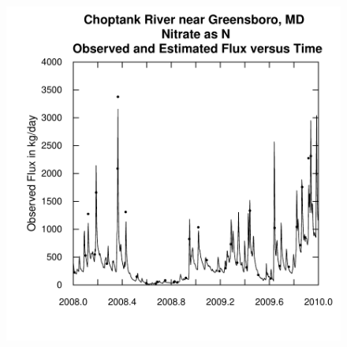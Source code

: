 \documentclass[a4paper,11pt]{article}
\begin{document}
\begin{figure}[htbp]
  \begin{minipage}[h]{0.5\linewidth}
    \begin{center}

\includegraphics{EGRET-figplotFluxTimeDaily}
    \label{fig:plotFluxTimeDaily}
    \end{center}
  \end{minipage}
  \begin{minipage}[h]{0.5\linewidth}
    \begin{center}



\end{center}
\end{minipage}
\end{figure}
\end{document}
